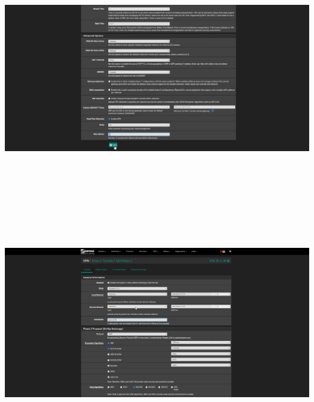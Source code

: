 \documentclass{article} %
\begin{document}
\noindent \includegraphics*[width=6.01in, height=3.56in, trim=1.11in 0.27in 0.84in 0.00in]{image27}

\noindent 

\noindent 

\noindent \includegraphics*[width=6.17in, height=4.48in, trim=1.72in 0.03in 1.80in 0.26in]{image28}
\end{document}
